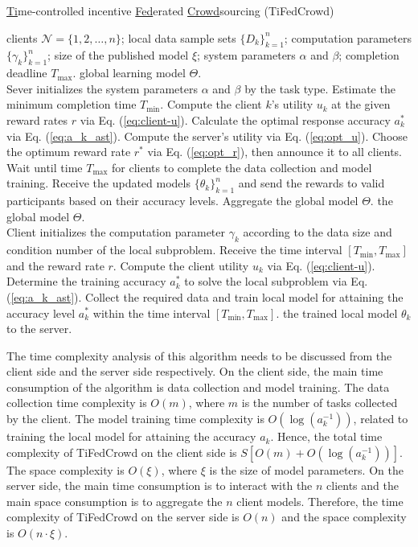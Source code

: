 \documentclass[final,1p,times]{elsarticle}
\begin{document}
\begin{algorithm}[H]
	\caption{\underline {Ti}me-controlled incentive \underline{Fed}erated \underline{Crowd}sourcing (TiFedCrowd)}
	\label{Algo1}
	\begin{algorithmic}[1]
		\REQUIRE clients $\bm{\mathcal{N}} = \{1,2,\dots,n\}$; local data sample sets $\{D_k\}_{k=1}^n$; computation
		parameters $\{\gamma_k\}_{k=1}^n$; size of the published model $\xi$;  system parameters $\alpha$ and $\beta$; completion deadline $T_{\max}$.
		\ENSURE global learning model $\Theta$.\\
		\STATE Sever initializes the system parameters $\alpha$ and $\beta$ by the task type.
		\STATE Estimate the minimum completion time $T_{\min}$.
		\STATE Compute the client $k$’s utility $u_k$ at the given reward rates $r$ via Eq. (\ref{eq:client-u}).
		\STATE Calculate the optimal response accuracy $a_k^\ast$ via Eq. (\ref{eq:a_k_ast}).
		\ENDIF
		\ENDFOR
		\STATE Compute the server’s utility via Eq. (\ref{eq:opt_u}).
		\STATE Choose the optimum reward rate $r^\ast$ via Eq. (\ref{eq:opt_r}), then announce it to all clients.
		\STATE Wait until time $T_{\max}$ for clients to complete the data collection and model training.
		\STATE Receive the updated models $\{\theta_k\}_{k=1}^n$ and send the rewards to valid participants based on their accuracy levels. Aggregate the global model $\Theta$.
		\RETURN the global model $\Theta$.\\
		\STATE Client initializes the computation
		parameter $\gamma_k$ according to the data size and condition number of the local subproblem.
		\STATE Receive the time interval $[T_{\min},T_{\max}]$ and the reward rate $r$.
		\STATE Compute the client utility $u_k$ via Eq. (\ref{eq:client-u}).
		\STATE Determine the training accuracy $a_k^\ast$ to solve the local subproblem via Eq. (\ref{eq:a_k_ast}).
		\STATE Collect the required data and train local model for attaining the accuracy level $a_k^\ast$ within the time interval $[T_{\min},T_{\max}]$.
		\RETURN the trained local model $\theta_k$ to the server.
	\end{algorithmic}
\end{algorithm}

The time complexity analysis of this algorithm needs to be discussed from the client side and the server side respectively. On the client side, the main time consumption of the algorithm is data collection and model training. The data collection time complexity is $O(m)$, where $m$ is the number of tasks collected by the client. The model training time complexity is $O(\log(a_k^{-1}))$, related to training the local model for attaining the accuracy $a_k$. Hence, the total time complexity of TiFedCrowd on the client side is $S[O(m)+O(\log(a_k^{-1}))]$. The space complexity is $O(\xi)$, where $\xi$ is the size of model parameters. On the server side, the main time consumption is to interact with the $n$ clients and the main space consumption is to aggregate the $n$ client models. Therefore, the time complexity of TiFedCrowd on the server side is $O(n)$ and the space complexity is $O(n\cdot\xi)$.
\end{document}
